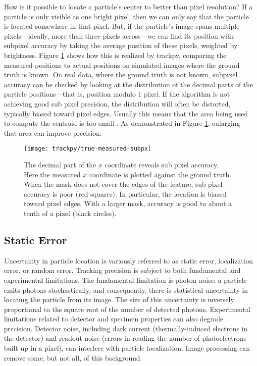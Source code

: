How is it possible to locate a particle's center to better than pixel resolution? If a particle is only visible as one bright pixel, then we can only say that the particle is located somewhere in that pixel. But, if the particle's image spans multiple pixels---ideally, more than three pixels across---we can find its position with subpixel accuracy by taking the average position of these pixels, weighted by brightness. Figure \ref{fig:true-measured-subpx} shows how this is realized by trackpy, comparing the measured positions to actual positions on simulated images where the ground truth is known. On real data, where the ground truth is not known, subpixel accuracy can be checked by looking at the distribution of the decimal parts of the particle positions---that is, position modulo 1 pixel. If the algorithm is not achieving good sub pixel precision, the distribution will often be distorted, typically biased toward pixel edges. Usually this means that the area being used to compute the centroid is too small \cite{Crocker2007}. As demonstrated in Figure \ref{fig:true-measured-subpx}, enlarging that area can improve precision.

   \begin{figure}
    \centering
    \texttt{[image: trackpy/true-measured-subpx]}
    \caption{\label{fig:true-measured-subpx}The decimal part of the $x$ coordinate reveals sub pixel accuracy. Here the measured $x$ coordinate is plotted against the ground truth. When the mask does not cover the edges of the feature, sub pixel accuracy is poor (red squares). In particular, the location is biased toward pixel edges. With a larger mask, accuracy is good to about a tenth of a pixel (black circles).}
    \end{figure}

\subsection{Static Error}

Uncertainty in particle location is variously referred to as static error, localization error, or random error\cite{Savin2005,Martin2002a,Crocker1996}. Tracking precision is subject to both fundamental and experimental limitations. The fundamental limitation is photon noise: a particle emits photons stochastically, and consequently, there is statistical uncertainty in locating the particle from its image. The size of this uncertainty is inversely proportional to the square root of the number of detected photons\cite{Ober2004}. Experimental limitations related to detector and specimen properties can also degrade precision. Detector noise, including dark current (thermally-induced electrons in the detector) and readout noise (errors in reading the number of photoelectrons built up in a pixel), can interfere with particle localization\cite{Thompson2002,Deschout2012}. Image processing can remove some, but not all, of this background\cite{Deschout2014}.

